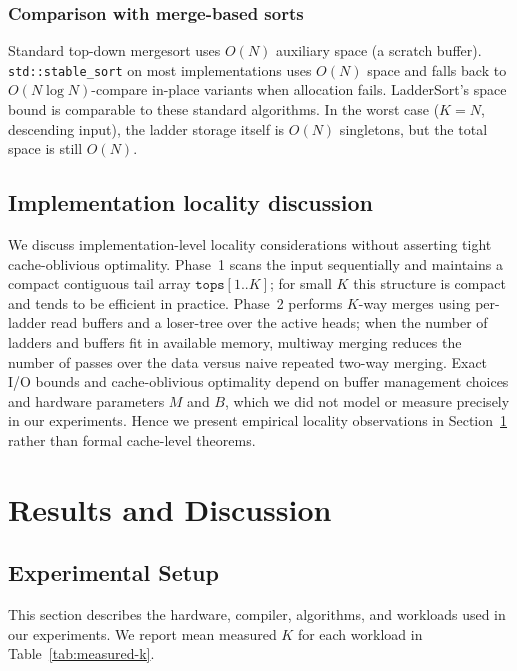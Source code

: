 \documentclass{ieeeaccess}
\theoremstyle{plain}
\theoremstyle{definition}
\newcommand{\tops}{\texttt{tops}}
\begin{document}
\subsubsection{Comparison with merge-based sorts}
Standard top-down mergesort uses $O(N)$ auxiliary space (a scratch buffer).
\texttt{std::stable\_sort} on most implementations uses $O(N)$ space and
falls back to $O(N \log N)$-compare in-place variants when allocation fails.
LadderSort's space bound is comparable to these standard algorithms.
In the worst case ($K = N$, descending input), the ladder storage itself
is $O(N)$ singletons, but the total space is still $O(N)$.

\subsection{Implementation locality discussion}
\label{sec:io}

We discuss implementation-level locality considerations without asserting
tight cache-oblivious optimality.  Phase~1 scans the input sequentially and
maintains a compact contiguous tail array $\tops[1..K]$; for small $K$ this
structure is compact and tends to be efficient in practice.  Phase~2
performs $K$-way merges using per-ladder read buffers and a loser-tree over
the active heads; when the number of ladders and buffers fit in available
memory, multiway merging reduces the number of passes over the data versus
naive repeated two-way merging.  Exact I/O bounds and cache-oblivious
optimality depend on buffer management choices and hardware parameters $M$
and $B$, which we did not model or measure precisely in our experiments.
Hence we present empirical locality observations in Section~\ref{sec:results}
rather than formal cache-level theorems.



\section{Results and Discussion}
\label{sec:results}


\subsection{Experimental Setup}
\label{sec:setup}
This section describes the hardware, compiler, algorithms, and workloads used in our experiments.  We report mean measured $K$ for each workload in Table~\ref{tab:measured-k}.
\end{document}
